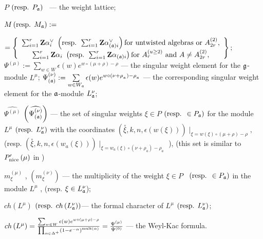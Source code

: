 \documentclass[a4paper,12pt]{article}
\theoremstyle{definition} \newtheorem{Def}{Definition}
\begin{document}
$P$ $\left( \text{resp. } P_{\frak{a}}\right) $ \ --- the weight lattice;

$M \left( \text{resp. }M_{\frak{a}}\right) :=$

\noindent $=\left\{ 
\begin{array}{c}
\sum_{i=1}^{r}\mathbf{Z}\alpha _{i}^{\vee }\text{ }\left( \text{resp. }%
\sum_{i=1}^{r}\mathbf{Z}\alpha _{\left( \frak{a}\right) i}^{\vee }\right) 
\text{for untwisted algebras or }A_{2r}^{\left( 2\right) }, \\ 
\sum_{i=1}^{r}\mathbf{Z}\alpha _{i}\text{ }\left( \text{resp. }\sum_{i=1}^{r}%
\mathbf{Z}\alpha _{\left( \frak{a}\right) i}\right) \text{for }A_{r}^{\left(
u\geq 2\right) }\text{ and }A\neq A_{2r}^{\left( 2\right) },
\end{array}
\right\} ;$
$\Psi ^{\left( \mu \right) }:=\sum\limits_{w\in W}\epsilon (w)e^{w\circ (\mu +\rho )-\rho }$ --- the singular weight element for the $\frak{g}$-module $L^{\mu }$;
$\Psi _{\left( \frak{a}\right) }^{\left( \nu \right) }:=\sum\limits_{w\in W_{\frak{a}}}\epsilon (w)e^{w\circ (\nu +\rho
_{_{\frak{a}}})-\rho _{_{\frak{a}}}}$ --- the corresponding singular weight
element for the $\frak{a}$-module $L_{\frak{a}}^{\nu }$;

$\widehat{\Psi ^{\left( \mu \right) }}$ $\left( \widehat{\Psi _{\left( \frak{%
a}\right) }^{\left( \nu \right) }}\right) $ --- the set of singular weights $%
\xi \in P$ $\left( \text{resp. }\in P_{\frak{a}}\right) $ for the module $%
L^{\mu }$ $\left( \text{resp. }L_{\frak{a}}^{\nu }\right) $ with the
coordinates $\left( \overset{\circ }{\xi },k,n,\epsilon \left( w\left( \xi
\right) \right) \right) \mid _{\xi =w\left( \xi \right) \circ (\mu +\rho
)-\rho },$ (resp. $\left( \overset{\circ }{\xi },k,n,\epsilon \left(
w_{a}\left( \xi \right) \right) \right) \mid _{\xi =w_{a}\left( \xi \right)
\circ (\nu +\rho _{a})-\rho _{a}}$ ), (this set is similar to $P_{\mathrm{%
nice}}^{\prime }\left( \mu \right) $ in \cite{wakimoto2001idl})

$m_{\xi }^{\left( \mu \right) }$ , $\left( m_{\xi }^{\left( \nu \right)
}\right) $ --- the multiplicity of the weight $\xi \in P$ \ $\left( \text{%
resp. }\in P_{\frak{a}}\right) $ in the module $L^{\mu }$ , (resp. $\xi \in
L_{\frak{a}}^{\nu } $);

$ch\left( L^{\mu }\right) $ $\left( \text{resp. }ch\left( L_{\frak{a}}^{\nu
}\right) \right) $--- the formal character of $L^{\mu }$ $\left( \text{resp. }%
L_{\frak{a}}^{\nu }\right) $;

$ch\left( L^{\mu }\right) =\frac{\sum_{w\in W}\epsilon (w)e^{w\circ (\mu
+\rho )-\rho }}{\prod_{\alpha \in \Delta ^{+}}\left( 1-e^{-\alpha }\right) ^{%
\mathrm{{mult}\left( \alpha \right) }}}=\frac{\Psi ^{\left( \mu \right) }}{%
\Psi ^{\left( 0\right) }}$ --- the Weyl-Kac formula.
\end{document}

